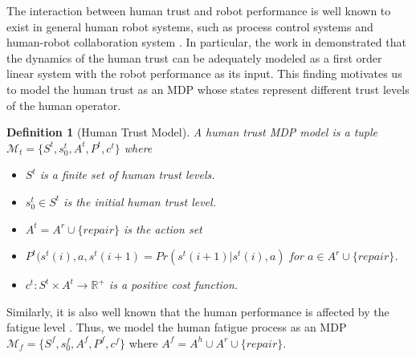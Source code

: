 \documentclass[journal]{IEEEtran}
\newtheorem{definition}{Definition}
\begin{document}
The interaction between human trust and robot performance is well known to exist in general human robot systems, such as process control systems \cite{muir1990operators} and human-robot collaboration system \cite{desai2013impact}. %
In particular, the work in \cite{lee1992trust, desai2013impact} demonstrated that the dynamics of the human trust can be adequately modeled as a first order linear system with the robot performance as its input. This finding motivates us to model the human trust as an MDP whose states represent different trust levels of the human operator. %

\begin{definition}[Human Trust Model]
	A human trust MDP model is a tuple $\mathcal{M}_{t}=\{S^{t}, s_0^t, A^t, {P}^{t}, c^{t}\}$ where
	\begin{itemize}
		\item $S^{t}$ is a finite set of human trust levels.
		\item $s^{t}_{0} \in S^{t}$ is the initial human trust level.
		\item $A^t=A^r\cup\{repair\}$ is the action set
		\item ${P}^{t}(s^t(i),a,s^{t}(i+1)=Pr(s^{t}(i+1)|s^t(i),a)$ for $a\in A^r\cup\{repair\}$.
		\item $c^{t}: S^{t} \times A^t \rightarrow \mathbb{R}^{+}$ is a positive cost function. 
	\end{itemize}
\end{definition} 
Similarly, it is also well known that the human performance is affected by the fatigue level \cite{ji2006probabilistic}. Thus, we model the human fatigue process as an MDP $\mathcal{M}_{f}=\{S^{f}, s_0^f, A^f, {P}^{f}, c^{f}\}$ where $A^f=A^h\cup A^r\cup \{repair\}$.
\end{document}
